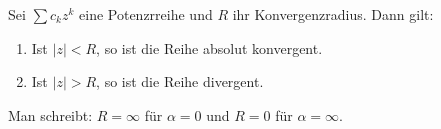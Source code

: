 Sei $\sum c_k z^k$ eine Potenzrreihe und $R$ ihr Konvergenzradius. Dann gilt:

\begin{enumerate}
    \item Ist $|z| < R$, so ist die Reihe absolut konvergent.
    \item Ist $|z| > R$, so ist die Reihe divergent.
\end{enumerate}

Man schreibt: $R = \infty$ für $\alpha = 0$ und $R = 0$ für $\alpha = \infty$. 